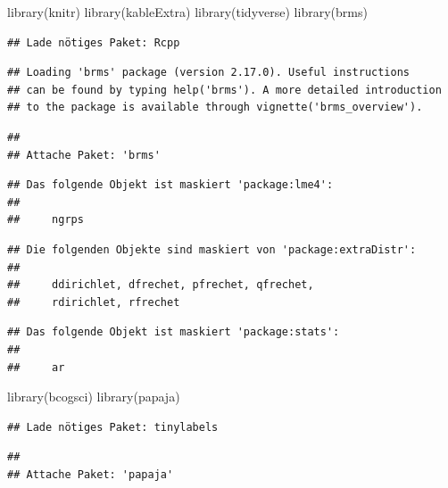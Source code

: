 \documentclass[
  12pt,
]{krantz}
\newenvironment{Shaded}{\begin{snugshade}}{\end{snugshade}}
\newcommand{\FunctionTok}[1]{\textcolor[rgb]{0.00,0.00,0.00}{#1}}
\newcommand{\NormalTok}[1]{#1}
\theoremstyle{definition}
\theoremstyle{definition}
\theoremstyle{definition}
\theoremstyle{definition}
\theoremstyle{remark}
\begin{document}
\begin{Shaded}
\begin{Highlighting}[]
\FunctionTok{library}\NormalTok{(knitr)}
\FunctionTok{library}\NormalTok{(kableExtra)}
\FunctionTok{library}\NormalTok{(tidyverse)}
\FunctionTok{library}\NormalTok{(brms)}
\end{Highlighting}
\end{Shaded}

\begin{verbatim}
## Lade nötiges Paket: Rcpp
\end{verbatim}

\begin{verbatim}
## Loading 'brms' package (version 2.17.0). Useful instructions
## can be found by typing help('brms'). A more detailed introduction
## to the package is available through vignette('brms_overview').
\end{verbatim}

\begin{verbatim}
## 
## Attache Paket: 'brms'
\end{verbatim}

\begin{verbatim}
## Das folgende Objekt ist maskiert 'package:lme4':
## 
##     ngrps
\end{verbatim}

\begin{verbatim}
## Die folgenden Objekte sind maskiert von 'package:extraDistr':
## 
##     ddirichlet, dfrechet, pfrechet, qfrechet,
##     rdirichlet, rfrechet
\end{verbatim}

\begin{verbatim}
## Das folgende Objekt ist maskiert 'package:stats':
## 
##     ar
\end{verbatim}

\begin{Shaded}
\begin{Highlighting}[]
\FunctionTok{library}\NormalTok{(bcogsci)}
\FunctionTok{library}\NormalTok{(papaja)}
\end{Highlighting}
\end{Shaded}

\begin{verbatim}
## Lade nötiges Paket: tinylabels
\end{verbatim}

\begin{verbatim}
## 
## Attache Paket: 'papaja'
\end{verbatim}
\end{document}
